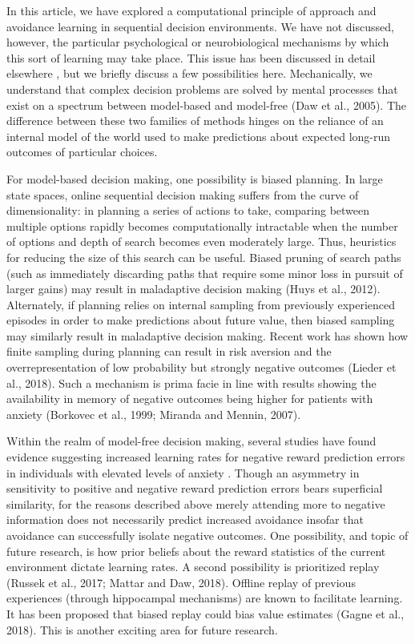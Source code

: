 \documentclass[11pt]{article} %
\begin{document}
In this article, we have explored a computational principle of approach and
avoidance learning in sequential decision environments. We have not discussed,
however, the particular psychological or neurobiological mechanisms by which this
sort of learning may take place. This issue has been discussed in detail elsewhere
\cite{Bishop2018}, but we briefly discuss a few possibilities here. Mechanically,
we understand that complex decision problems are solved by mental processes that
exist on a spectrum between model-based and model-free (Daw et al., 2005). The
difference between these two families of methods hinges on the reliance of an
internal model of the world used to make predictions about expected long-run
outcomes of particular choices.

For model-based decision making, one possibility is biased planning. In large
state spaces, online sequential decision making suffers from the curve of
dimensionality: in planning a series of actions to take, comparing between
multiple options rapidly becomes computationally intractable when the number of
options and depth of search becomes even moderately large. Thus, heuristics for
reducing the size of this search can be useful. Biased pruning of search paths
(such as immediately discarding paths that require some minor loss in pursuit of
larger gains) may result in maladaptive decision making (Huys et al., 2012).
Alternately, if planning relies on internal sampling from previously experienced
episodes in order to make predictions about future value, then biased sampling
 may similarly result in maladaptive decision making. Recent work has shown how
 finite sampling during planning can result in risk aversion and the overrepresentation
 of low probability but strongly negative outcomes (Lieder et al., 2018). Such a
 mechanism is prima facie in line with results showing the availability in memory
 of negative outcomes being higher for patients with anxiety (Borkovec et al., 1999;
 Miranda and Mennin, 2007).

Within the realm of model-free decision making, several studies have found evidence
suggesting increased learning rates for negative reward prediction errors in
individuals with elevated levels of anxiety \cite{Aylward, Huang2017, Harle2017
garrett2018}. Though an asymmetry in sensitivity to
positive and negative reward prediction errors bears superficial similarity, for
the reasons described above merely attending more to negative information does not
necessarily predict increased avoidance insofar that avoidance can successfully
isolate negative outcomes. One possibility, and topic of future research, is how
prior beliefs about the reward statistics of the current environment dictate
learning rates. A second possibility is prioritized replay (Russek et al., 2017;
Mattar and Daw, 2018). Offline replay of previous experiences (through hippocampal
mechanisms) are known to facilitate learning. It has been proposed that biased
replay could bias value estimates (Gagne et al., 2018). This is another exciting
area for future research.
\end{document}
